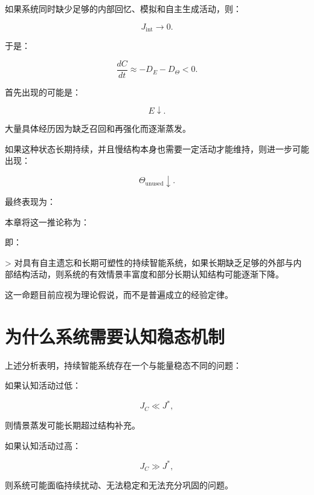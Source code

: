 如果系统同时缺少足够的内部回忆、模拟和自主生成活动，则：

\[
J_{\mathrm{int}}\rightarrow0.
\]

于是：

\[
\frac{dC}{dt}
\approx
-
D_E-D_\Theta<0.
\]

首先出现的可能是：

\[
E\downarrow.
\]

大量具体经历因为缺乏召回和再强化而逐渐蒸发。

如果这种状态长期持续，并且慢结构本身也需要一定活动才能维持，则进一步可能出现：

\[
\Theta_{\mathrm{unused}}\downarrow.
\]

最终表现为：

\begin{statementbox}
\centering
{}
\end{statementbox}

本章将这一推论称为：

\begin{statementbox}
\centering
{}
\end{statementbox}

即：

> 对具有自主遗忘和长期可塑性的持续智能系统，如果长期缺乏足够的外部与内部结构活动，则系统的有效情景丰富度和部分长期认知结构可能逐渐下降。

这一命题目前应视为理论假说，而不是普遍成立的经验定律。

\section{为什么系统需要认知稳态机制}

上述分析表明，持续智能系统存在一个与能量稳态不同的问题：

\begin{statementbox}
\centering
{}
\end{statementbox}

如果认知活动过低：

\[
J_C\ll J^*,
\]

则情景蒸发可能长期超过结构补充。

如果认知活动过高：

\[
J_C\gg J^*,
\]

则系统可能面临持续扰动、无法稳定和无法充分巩固的问题。

